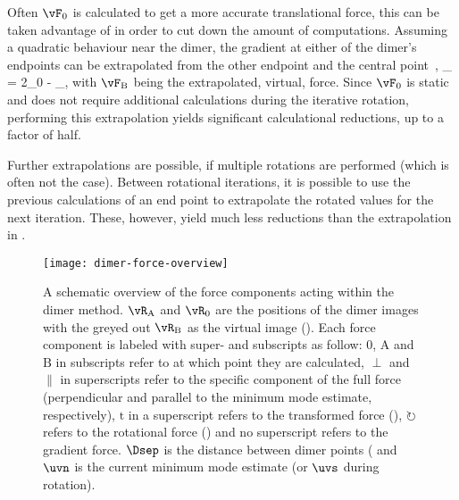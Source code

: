 Often $\vF_0$ is calculated to get a more accurate translational force, this can be taken advantage of in order to cut down the amount of computations.
Assuming a quadratic behaviour near the dimer, the gradient at either of the dimer's endpoints can be extrapolated from the other endpoint and the central point~\cite{dimer-olsen-2004},
\vF_ = 2\vF_0 - \vF_,
\eeq
with $\vF_\text{B}$ being the extrapolated, virtual, force.
Since $\vF_0$ is static and does not require additional calculations during the iterative rotation, performing this extrapolation yields significant calculational reductions, up to a factor of half.

Further extrapolations are possible, if multiple rotations are performed (which is often not the case).
Between rotational iterations, it is possible to use the previous calculations of an end point to extrapolate the rotated values for the next iteration.\cite{dimer-kastner-2008}
These, however, yield much less reductions than the extrapolation in .

\begin{figure}[h]
  \begin{center}
    \texttt{[image: dimer-force-overview]}
\parbox{0.85\linewidth}{\caption{A schematic overview of the force components acting within the dimer method.
$\vR_\text{A}$ and $\vR_0$ are the positions of the dimer images with the greyed out $\vR_\text{B}$ as the virtual image ().
Each force component is labeled with super- and subscripts as follow:
$0$, $\text{A}$ and $\text{B}$ in subscripts refer to at which point they are calculated,
$\perp$ and $\parallel$ in superscripts refer to the specific component of the full force (perpendicular and parallel to the minimum mode estimate, respectively),
$\text{t}$ in a superscript refers to the transformed force (),
$\circlearrowright$ refers to the rotational force () and no superscript refers to the gradient force.
$\Dsep$ is the distance between dimer points ( and $\uvn$ is the current minimum mode estimate (or $\uvs$ during rotation).
}
\label{fig:dimer-force-overview}
}
  \end{center}
\end{figure}

